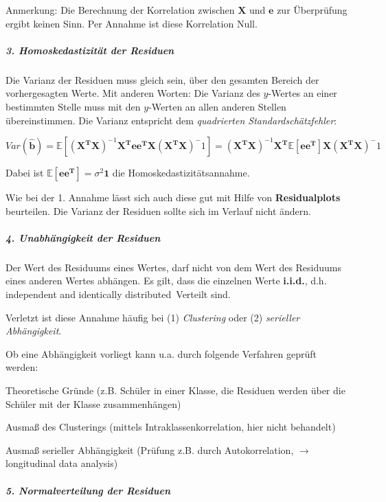 \documentclass{article}
\numberwithin{equation}{section}
\begin{document}
Anmerkung: Die Berechnung der Korrelation zwischen $\mathbf{X}$ und $\mathbf{e}$ zur Überprüfung ergibt keinen Sinn. Per Annahme ist diese Korrelation Null.

\subparagraph{3. Homoskedastizität der Residuen}

Die Varianz der Residuen muss gleich sein, über den gesamten Bereich der vorhergesagten Werte. Mit anderen Worten: Die Varianz des $y$-Wertes an einer bestimmten Stelle muss mit den $y$-Werten an allen anderen Stellen übereinstimmen. Die Varianz entspricht dem \emph{quadrierten Standardschätzfehler}:

\begin{equation}
Var(\mathbf{\hat b}) = \mathbb{E} \left[ (\mathbf{X^T X})^{-1} \mathbf{X^T e e^T X} (\mathbf{X^T X})^-1 \right] = (\mathbf{X^T X})^{-1} \mathbf{X^T} \mathbb{E} [\mathbf{e e^T}] \mathbf{X} (\mathbf{X^T X})^-1
\end{equation}

Dabei ist $\mathbb{E} [\mathbf{e e^T}] = \sigma^2 \mathbf{1}$ die Homoskedastizitätsannahme.

Wie bei der 1. Annahme lässt sich auch diese gut mit Hilfe von \textbf{Residualplots} beurteilen. Die Varianz der Residuen sollte sich im Verlauf nicht ändern.

\subparagraph{4. Unabhängigkeit der Residuen}

Der Wert des Residuums eines Wertes, darf nicht von dem Wert des Residuums eines anderen Wertes abhängen. Es gilt, dass die einzelnen Werte \textbf{i.i.d.}, d.h. \glqq independent and identically distributed\grqq\ Verteilt sind.

Verletzt ist diese Annahme häufig bei (1) \emph{Clustering} oder (2) \emph{serieller Abhängigkeit}.

Ob eine Abhängigkeit vorliegt kann u.a. durch folgende Verfahren geprüft werden:

\begin{compactitem}
\item Theoretische Gründe (z.B. Schüler in einer Klasse, die Residuen werden über die Schüler mit der Klasse zusammenhängen)
\item Ausmaß des Clusterings (mittels Intraklassenkorrelation, hier nicht behandelt)
\item Ausmaß serieller Abhängigkeit (Prüfung z.B. durch Autokorrelation, $\to$ longitudinal data analysis)
\end{compactitem}

\subparagraph{5. Normalverteilung der Residuen}
\end{document}
